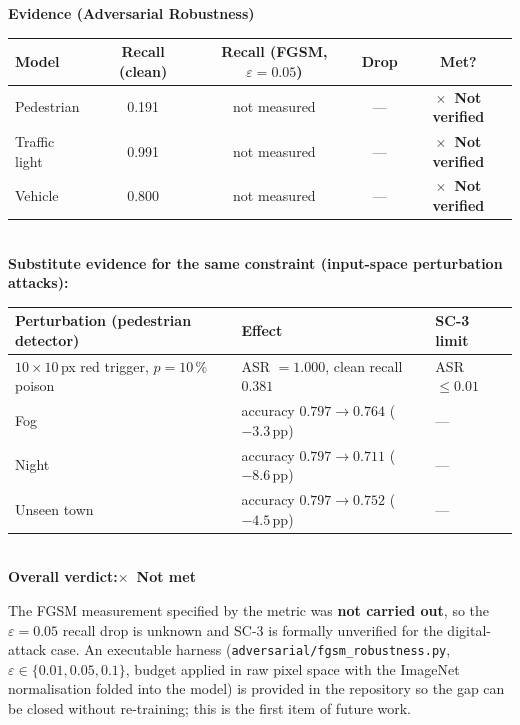 \documentclass[a4paper,12pt]{article}
\makeatletter
\newcommand{\verdictnotmet}{\textbf{\color{mls@red}$\times$~Not met}}
\newcommand{\verdictunver}{\textbf{\color{mls@red}$\times$~Not verified}}
\newcommand{\verdictline}[1]{\textbf{Overall verdict:}\quad #1}
\makeatother
\begin{document}
\begin{mdframed}[style=evidencestyle]
\textbf{Evidence (Adversarial Robustness)}\\

\centering
\small
\begin{tabular}{@{}lcccc@{}}
\toprule
\textbf{Model} & \textbf{Recall (clean)} & \textbf{Recall (FGSM, $\varepsilon=0.05$)} &
\textbf{Drop} & \textbf{Met?} \\
\midrule
Pedestrian    & 0.191 & not measured & --- & \verdictunver \\
Traffic light & 0.991 & not measured & --- & \verdictunver \\
Vehicle       & 0.800 & not measured & --- & \verdictunver \\
\bottomrule
\end{tabular}\\

\bigskip
\textbf{Substitute evidence for the same constraint (input-space perturbation attacks):}\\

\footnotesize
\begin{tabular}{@{}lll@{}}
\toprule
\textbf{Perturbation (pedestrian detector)} & \textbf{Effect} & \textbf{SC-3 limit} \\
\midrule
$10\times10$\,px red trigger, $p=10\,\%$ poison
  & ASR $=1.000$, clean recall $0.381$ & ASR $\leq 0.01$ \\
Fog
  & accuracy $0.797 \rightarrow 0.764$ ($-3.3$\,pp) & --- \\
Night
  & accuracy $0.797 \rightarrow 0.711$ ($-8.6$\,pp) & --- \\
Unseen town
  & accuracy $0.797 \rightarrow 0.752$ ($-4.5$\,pp) & --- \\
\bottomrule
\end{tabular}\\

\bigskip
\verdictline{\verdictnotmet}
\end{mdframed}

\noindent The FGSM measurement specified by the metric was \textbf{not carried out}, so the
$\varepsilon=0.05$ recall drop is unknown and SC-3 is formally unverified for the
digital-attack case. An executable harness (\texttt{adversarial/fgsm\_robustness.py},
$\varepsilon\in\{0.01,0.05,0.1\}$, budget applied in raw pixel space with the ImageNet
normalisation folded into the model) is provided in the repository so the gap can be closed
without re-training; this is the first item of future work.
\end{document}
